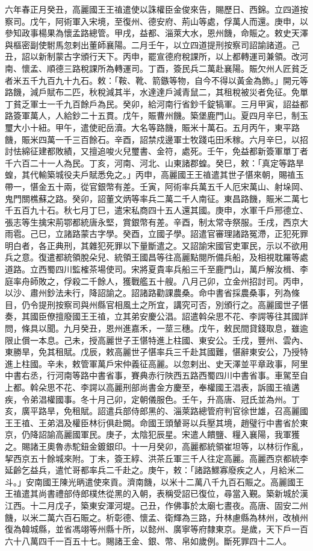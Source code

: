 \begin{pinyinscope}
 六年春正月癸丑，高麗國王王禃遣使以誅權臣金俊來告，賜歷日、西錦。立四道按察司。戊午，阿術軍入宋境，至復州、德安府、荊山等處，俘萬人而還。庚申，以參知政事楊果為懷孟路總管。甲戌，益都、淄萊大水，恩州饑，命賑之。敕史天澤與樞密副使駙馬忽剌出董師襄陽。二月壬午，以立四道提刑按察司詔諭諸道。己丑，詔以新制蒙古字頒行天下。丙申，罷宣德府稅課所，以上都轉運司兼領。改河南、懷孟、順德三路稅課所為轉運司。丁酉，簽民兵二萬赴襄陽。賑欠州人匠貧乏者米五千九百九十九石。敕：「鞍、靴、箭鏃等物，自今不得以黃金為飾。」開元等路饑，減戶賦布二匹，秋稅減其半，水達達戶減青鼠二，其租稅被災者免征。免單丁貧乏軍士一千九百餘戶為民。癸卯，給河南行省鈔千錠犒軍。三月甲寅，詔益都路簽軍萬人，人給鈔二十五貫。戊午，賑曹州饑。築堡鹿門山。夏四月辛巳，制玉璽大小十紐。甲午，遣使祀岳瀆。大名等路饑，賑米十萬石。五月丙午，東平路饑，賑米四萬一千三百餘石。辛酉，詔禁戍邊軍士牧踐屯田禾稼。六月辛巳，以招討怯綿征建都敗績，又擅追唆火兒璽書、金符，處死。壬午，免益都新簽軍單丁者千六百二十一人為民。丁亥，河南、河北、山東諸郡蝗。癸巳，敕：「真定等路旱蝗，其代輸築城役夫戶賦悉免之。」丙申，高麗國王王禃遣其世子愖來朝，賜禃玉帶一，愖金五十兩，從官銀幣有差。壬寅，阿術率兵萬五千人厄宋萬山、射垛岡、鬼門關樵蘇之路。癸卯，詔董文炳等率兵二萬二千人南征。東昌路饑，賑米二萬七千五百九十石。秋七月丁巳，遣宋私商四十五人還其國。庚申，水軍千戶邢德立、張志等生擒宋荊鄂都統唐永堅，賞銀幣有差。辛酉，制太常寺祭服。壬戌，西京大雨雹。己巳，立諸路蒙古字學。癸酉，立國子學。詔遣官審理諸路冤滯，正犯死罪明白者，各正典刑，其雜犯死罪以下量斷遣之。又詔諭宋國官吏軍民，示以不欲用兵之意。復遣都統領脫朵兒、統領王國昌等往高麗點閱所備兵船，及相視耽羅等處道路。立西蜀四川監榷茶場使司。宋將夏貴率兵船三千至鹿門山，萬戶解汝楫、李庭率舟師敗之，俘殺二千餘人，獲戰艦五十艘。八月己卯，立金州招討司。丙申，以沙、肅州鈔法未行，降詔諭之。詔諸路勸課農桑。命中書省採農桑事，列為條目，仍令提刑按察司與州縣官相風土之所宜，講究可否，別頒行之。高麗國世子愖奏，其國臣僚擅廢國王王禃，立其弟安慶公淐。詔遣斡朵思不花、李諤等往其國詳問，條具以聞。九月癸丑，恩州進嘉禾，一莖三穗。戊午，敕民間貸錢取息，雖逾限止償一本息。己未，授高麗世子王愖特進上柱國、東安公。壬戌，豐州、雲內、東勝旱，免其租賦。戊辰，敕高麗世子愖率兵三千赴其國難，愖辭東安公，乃授特進上柱國。辛未，敕管軍萬戶宋仲義征高麗。以忽剌出、史天澤並平章政事，阿里中書右丞，行河南等路中書省事，賽典赤行陜西五路西蜀四川中書省事。車駕至自上都。斡朵思不花、李諤以高麗刑部尚書金方慶至，奉權國王淐表，訴國王禃遘疾，令弟淐權國事。冬十月己卯，定朝儀服色。壬午，升高唐、冠氏並為州。丁亥，廣平路旱，免租賦。詔遣兵部侍郎黑的、淄萊路總管府判官徐世雄，召高麗國王王禃、王弟淐及權臣林衍俱赴闕。命國王頭輦哥以兵壓其境，趙璧行中書省於東京，仍降詔諭高麗國軍民。庚子，太陰犯辰星。宋遣人饋鹽、糧入襄陽，我軍獲之。賜諸王奧魯赤駝鈕金鍍銀印。十一月癸卯，高麗都統領崔坦等，以林衍作亂，挈西京五十餘城來附。丁未，簽王綧、洪茶丘軍三千人往定高麗。高麗西京都統李延齡乞益兵，遣忙哥都率兵二千赴之。庚午，敕：「諸路鰥寡廢疾之人，月給米二斗。」安南國王陳光昞遣使來貢。濟南饑，以米十二萬八千九百石賑之。高麗國王王禃遣其尚書禮部侍郎樸烋從黑的入朝，表稱受詔已復位，尋當入覲。築新城於漢江西。十二月戊子，築東安渾河堤。己丑，作佛事於太廟七晝夜。高唐、固安二州饑，以米二萬六百石賑之。析彰德、懷孟、衛輝為三路，升林慮縣為林州，改楨州復為韓城縣，並省馮翊等州縣十所，以懿州、廣寧等府隸東京。是歲，天下戶一百六十八萬四千一百五十七。賜諸王金、銀、幣、帛如歲例。斷死罪四十二人。



\end{pinyinscope}